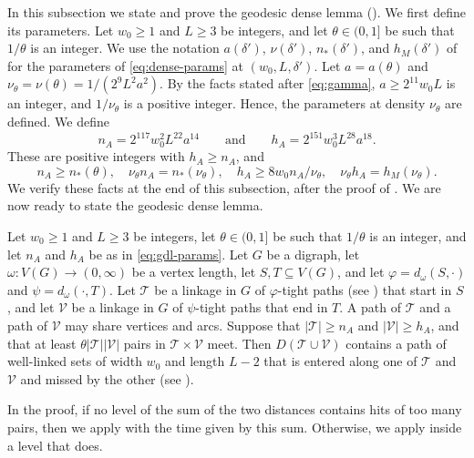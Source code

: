 \documentclass[fontsize=12pt,leading=14pt]{fullpaper}
\newcommand{\Tcal}{\mathcal{T}}
\newcommand{\Vcal}{\mathcal{V}}
\begin{document}
In this subsection we state and prove the geodesic dense lemma ().
We first define its parameters.
Let $w_0\ge1$ and $L\ge3$ be integers, and let $\theta\in(0,1]$ be such that $1/\theta$ is an integer.
We use the notation $a(\delta')$, $\nu(\delta')$, $n_*(\delta')$, and $h_M(\delta')$ of  for the parameters of \eqref{eq:dense-params} at $(w_0,L,\delta')$.
Let $a=a(\theta)$ and $\nu_\theta=\nu(\theta)=1/(2^9L^2a^2)$.
By the facts stated after \eqref{eq:gamma}, $a\ge2^{11}w_0L$ is an integer, and $1/\nu_\theta$ is a positive integer.
Hence, the parameters at density $\nu_\theta$ are defined.
We define
\begin{equation}\label{eq:gdl-params}
  n_A=2^{117}w_0^2L^{22}a^{14}
  \qquad\text{and}\qquad
  h_A=2^{151}w_0^3L^{28}a^{18}.
\end{equation}
These are positive integers with $h_A\ge n_A$, and
\begin{equation}\label{eq:gdl-ineq}
  n_A\ge n_*(\theta),\quad
  \nu_\theta n_A=n_*(\nu_\theta),\quad
  h_A\ge8w_0n_A/\nu_\theta,\quad
  \nu_\theta h_A=h_M(\nu_\theta).
\end{equation}
We verify these facts at the end of this subsection, after the proof of .
We are now ready to state the geodesic dense lemma.

\begin{lemma}\label{thm:gdl}
  Let $w_0\ge1$ and $L\ge3$ be integers, let $\theta\in(0,1]$ be such that $1/\theta$ is an integer, and let $n_A$ and $h_A$ be as in \eqref{eq:gdl-params}.
  Let $G$ be a digraph, let $\omega\colon V(G)\to(0,\infty)$ be a vertex length, let $S,T\subseteq V(G)$, and let $\varphi=d_\omega(S,\cdot)$ and $\psi=d_\omega(\cdot,T)$.
  Let $\Tcal$ be a linkage in $G$ of $\varphi$-tight paths (see ) that start in $S$, and let $\Vcal$ be a linkage in $G$ of $\psi$-tight paths that end in $T$.
  A path of $\Tcal$ and a path of $\Vcal$ may share vertices and arcs.
  Suppose that $|\Tcal|\ge n_A$ and $|\Vcal|\ge h_A$, and that at least $\theta|\Tcal||\Vcal|$ pairs in $\Tcal\times\Vcal$ meet.
  Then $D(\Tcal\cup\Vcal)$ contains a path of well-linked sets of width $w_0$ and length $L-2$ that is entered along one of $\Tcal$ and $\Vcal$ and missed by the other (see ).
\end{lemma}

In the proof, if no level of the sum of the two distances contains hits of too many pairs, then we apply  with the time given by this sum.
Otherwise, we apply  inside a level that does.
\end{document}
